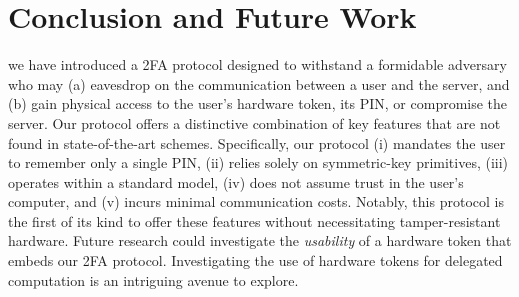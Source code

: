 
\vspace{-2.1mm}
\section{Conclusion and Future Work}
\vspace{-.5mm}

we have introduced a 2FA protocol designed to withstand a formidable adversary who may (a) eavesdrop on the communication between a user and the server, and (b) gain physical access to the user's hardware token, its PIN, or compromise the server. Our protocol offers a distinctive combination of key features that are not found in state-of-the-art schemes. 
%
Specifically,  our protocol (i) mandates the user to remember only a single PIN, (ii) relies solely on symmetric-key primitives, (iii) operates within a standard model, (iv) does not assume trust in the user's computer, and (v) incurs minimal communication costs. Notably, this protocol is the first of its kind to offer these features without necessitating tamper-resistant hardware. 
% 
%
Future research could investigate the \emph{usability} of a hardware token that embeds our 2FA protocol. Investigating the use of hardware tokens for delegated computation is an intriguing avenue to explore.




